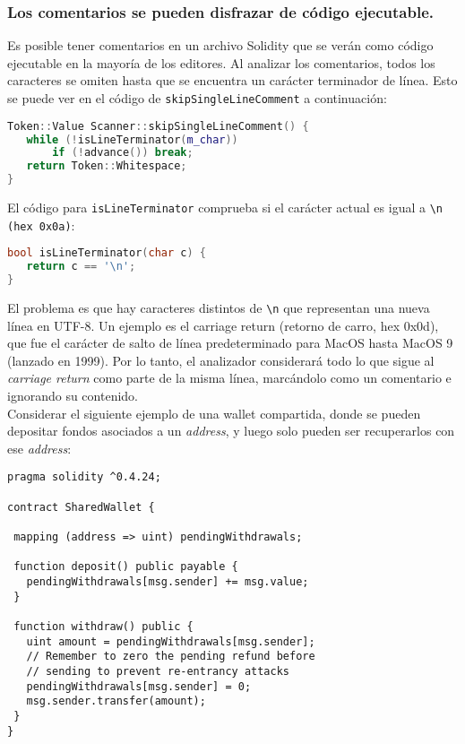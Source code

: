 \subsubsection{Los comentarios se pueden disfrazar de código ejecutable.}

Es posible tener comentarios en un archivo Solidity que se verán como código ejecutable en la mayoría de los editores. Al analizar los comentarios, todos los caracteres se omiten hasta que se encuentra un carácter terminador de línea. Esto se puede ver en el código de \verb|skipSingleLineComment| a continuación:\\

\begin{lstlisting}[language=c++]
Token::Value Scanner::skipSingleLineComment() {
   while (!isLineTerminator(m_char))
       if (!advance()) break;
   return Token::Whitespace;
}
\end{lstlisting}

El código para \verb|isLineTerminator| comprueba si el carácter actual es igual a \verb|\n (hex 0x0a)|:
\begin{lstlisting}[language=c++]
bool isLineTerminator(char c) {
   return c == '\n';
}
\end{lstlisting}

El problema es que hay caracteres distintos de \verb|\n| que representan una nueva línea en UTF-8. Un ejemplo es el carriage return (retorno de carro, hex 0x0d), que fue el carácter de salto de línea predeterminado para MacOS hasta MacOS 9 (lanzado en 1999). Por lo tanto, el analizador considerará todo lo que sigue al \textit{carriage return} como parte de la misma línea, marcándolo como un comentario e ignorando su contenido.\\

Considerar el siguiente ejemplo de una wallet compartida, donde se pueden depositar fondos asociados a un \textit{address}, y luego solo pueden ser recuperarlos con ese \textit{address}:\\

\begin{lstlisting}[language=Solidity]
pragma solidity ^0.4.24;

contract SharedWallet {

 mapping (address => uint) pendingWithdrawals;

 function deposit() public payable {
   pendingWithdrawals[msg.sender] += msg.value;
 }

 function withdraw() public {
   uint amount = pendingWithdrawals[msg.sender];
   // Remember to zero the pending refund before
   // sending to prevent re-entrancy attacks
   pendingWithdrawals[msg.sender] = 0;  
   msg.sender.transfer(amount);
 }
}
\end{lstlisting}

